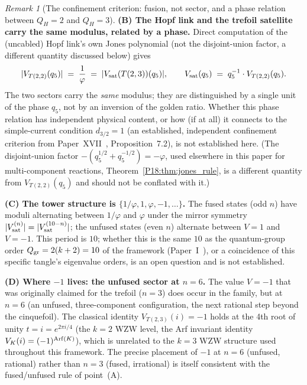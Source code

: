 \documentclass[11pt,a4paper]{article}
\theoremstyle{definition}\newtheorem{definition}[theorem]{Definition}
\theoremstyle{remark}
\newtheorem{remark}[theorem]{Remark}
\newcommand{\vp}{\varphi}
\newcommand{\QH}{Q_H}
\newcommand{\dimq}[1]{d_{#1}}
\newcommand{\Jones}{V}
\begin{document}
\begin{remark}[The confinement criterion: fusion, not sector, and a phase relation between $\QH=2$ and $\QH=3$]
\textbf{(B) The Hopf link and the trefoil satellite carry the same
modulus, related by a phase.}  Direct computation of the (uncabled)
Hopf link's own Jones polynomial (not the disjoint-union factor, a
different quantity discussed below) gives
\begin{equation}
  |\Jones_{T(2,2)}(q_5)| \;=\; \frac{1}{\vp}
  \;=\; |\Jones_{\rm sat}(T(2,3))(q_5)|,
  \qquad
  \Jones_{\rm sat}(q_5) \;=\; q_5^{-1}\cdot\Jones_{T(2,2)}(q_5).
  \label{P18:eq:phase_relation}
\end{equation}
The two sectors carry the \emph{same} modulus; they are distinguished
by a single unit of the phase $q_5$, not by an inversion of the
golden ratio.  Whether this phase relation has independent physical
content, or how (if at all) it connects to the simple-current
condition $\dimq{3/2}=1$ (an established, independent confinement
criterion from Paper~XVII~\cite{Paper17}, Proposition~7.2), is not
established here.
(The disjoint-union factor $-(q_5^{1/2}+q_5^{-1/2})=-\vp$, used
elsewhere in this paper for multi-component reactions,
Theorem~\ref{P18:thm:jones_rule}, is a different quantity from
$\Jones_{T(2,2)}(q_5)$ and should not be conflated with it.)

\textbf{(C) The tower structure is $\{1/\vp, 1, \vp, -1, \ldots\}$.}
The fused states (odd $n$) have moduli alternating between $1/\vp$
and $\vp$ under the mirror symmetry
$|\Jones_{\rm sat}^{(n)}|=|\Jones_{\rm sat}^{(10-n)}|$;
the unfused states (even $n$) alternate between $V=1$ and $V=-1$.
This period is $10$; whether this is the same $10$ as the
quantum-group order $Q_{\rm gr}=2(k+2)=10$ of the framework
(Paper~I~\cite{Paper1}), or a coincidence of this specific tangle's
eigenvalue orders, is an open question and is not established.

\textbf{(D) Where $-1$ lives: the unfused sector at $n=6$.}
The value $V=-1$ that was originally claimed for the trefoil ($n=3$)
does occur in the family, but at $n=6$ (an unfused, three-component
configuration, the next rational step beyond the cinquefoil).
The classical identity $V_{T(2,3)}(i)=-1$ holds at the 4th root of
unity $t=i=e^{2\pi i/4}$ (the $k=2$ WZW level, the Arf invariant
identity $V_K(i)=(-1)^{{\rm Arf}(K)}$), which is unrelated to
the $k=3$ WZW structure used throughout this framework.
The precise placement of $-1$ at $n=6$ (unfused, rational) rather
than $n=3$ (fused, irrational) is itself consistent with the
fused/unfused rule of point~(A).
\end{remark}

\end{document}
